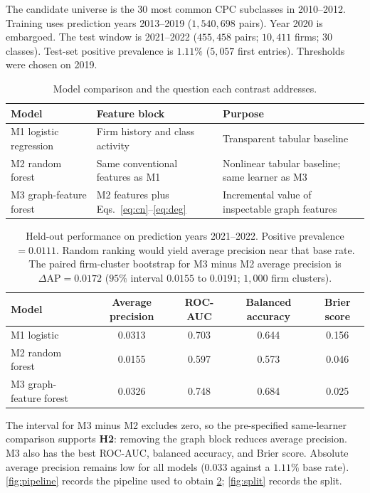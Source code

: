 \documentclass[preprint,12pt,3p]{elsarticle}
\begin{document}
The candidate universe is the 30 most common CPC subclasses in 2010--2012. Training uses prediction years 2013--2019 ($1{,}540{,}698$ pairs). Year 2020 is embargoed. The test window is 2021--2022 ($455{,}458$ pairs; $10{,}411$ firms; $30$ classes). Test-set positive prevalence is $1.11\%$ ($5{,}057$ first entries). Thresholds were chosen on 2019.

\begin{table}[t]
\centering
\caption{Model comparison and the question each contrast addresses.}
\label{tab:models}
\begin{tabular}{@{}lll@{}}
\toprule
Model & Feature block & Purpose \\
\midrule
M1 logistic regression & Firm history and class activity & Transparent tabular baseline \\
M2 random forest & Same conventional features as M1 & Nonlinear tabular baseline; same learner as M3 \\
M3 graph-feature forest & M2 features plus Eqs.~\eqref{eq:cn}--\eqref{eq:deg} & Incremental value of inspectable graph features \\
\bottomrule
\end{tabular}
\end{table}

\begin{table}[t]
\centering
\caption{Held-out performance on prediction years 2021--2022. Positive prevalence $=0.0111$. Random ranking would yield average precision near that base rate. The paired firm-cluster bootstrap for M3 minus M2 average precision is $\Delta\mathrm{AP}=0.0172$ ($95\%$ interval $0.0155$ to $0.0191$; $1{,}000$ firm clusters).}
\label{tab:results}
\begin{tabular}{@{}lcccc@{}}
\toprule
Model & Average precision & ROC-AUC & Balanced accuracy & Brier score \\
\midrule
M1 logistic & 0.0313 & 0.703 & 0.644 & 0.156 \\
M2 random forest & 0.0155 & 0.597 & 0.573 & 0.046 \\
M3 graph-feature forest & 0.0326 & 0.748 & 0.684 & 0.025 \\
\bottomrule
\end{tabular}
\end{table}

The interval for M3 minus M2 excludes zero, so the pre-specified same-learner comparison supports \textbf{H2}: removing the graph block reduces average precision. M3 also has the best ROC-AUC, balanced accuracy, and Brier score. Absolute average precision remains low for all models ($0.033$ against a $1.11\%$ base rate). \cref{fig:pipeline} records the pipeline used to obtain \cref{tab:results}; \cref{fig:split} records the split.
\end{document}
